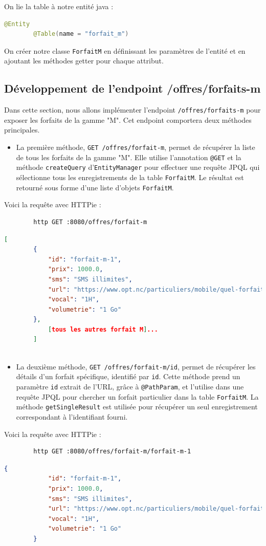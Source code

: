 \documentclass{article}
\begin{document}
	On lie la table à notre entité java :
	\begin{lstlisting}[language=java]
		@Entity
		@Table(name = "forfait_m") 
	\end{lstlisting}
	
	On créer notre classe \texttt{ForfaitM} en définissant les paramètres de l'entité et en ajoutant les méthodes getter pour chaque attribut.
		
	\subsection{Développement de l'endpoint /offres/forfaits-m}
	\label{subsec:endpoint-m}
	Dans cette section, nous allons implémenter l'endpoint \texttt{/offres/forfaits-m} pour exposer les forfaits de la gamme "M". Cet endpoint comportera deux méthodes principales.
	
	\begin{itemize}
		\item La première méthode, \texttt{GET /offres/forfait-m}, permet de récupérer la liste de tous les forfaits de la gamme "M". 
		Elle utilise l'annotation \texttt{@GET} et la méthode \texttt{createQuery} d'\texttt{EntityManager} pour effectuer une requête JPQL qui sélectionne tous les enregistrements de la table \texttt{ForfaitM}. 
		Le résultat est retourné sous forme d'une liste d'objets \texttt{ForfaitM}.
	\end{itemize}
	
	Voici la requête avec HTTPie : 
	
	\begin{lstlisting}
		http GET :8080/offres/forfait-m
	\end{lstlisting}
	\begin{lstlisting}[language=json]
		[
		{
			"id": "forfait-m-1",
			"prix": 1000.0,
			"sms": "SMS illimites",
			"url": "https://www.opt.nc/particuliers/mobile/quel-forfait-choisir/forfait-m-1-go",
			"vocal": "1H",
			"volumetrie": "1 Go"
		},
			[tous les autres forfait M]...
		]
		
	\end{lstlisting}
	
	\begin{itemize}
		\item La deuxième méthode, \texttt{GET /offres/forfait-m/{id}}, permet de récupérer les détails d'un forfait spécifique, identifié par \texttt{id}. 
		Cette méthode prend un paramètre \texttt{id} extrait de l'URL, grâce à \texttt{@PathParam}, et l'utilise dans une requête JPQL pour chercher un forfait particulier dans la table \texttt{ForfaitM}. 
		La méthode \texttt{getSingleResult} est utilisée pour récupérer un seul enregistrement correspondant à l'identifiant fourni.
	\end{itemize}
	Voici la requête avec HTTPie :
		\begin{lstlisting}
		http GET :8080/offres/forfait-m/forfait-m-1
	\end{lstlisting}
	\begin{lstlisting}[language=json]
		{
			"id": "forfait-m-1",
			"prix": 1000.0,
			"sms": "SMS illimites",
			"url": "https://www.opt.nc/particuliers/mobile/quel-forfait-choisir/forfait-m-1-go",
			"vocal": "1H",
			"volumetrie": "1 Go"
		}
	\end{lstlisting}
\end{document}
